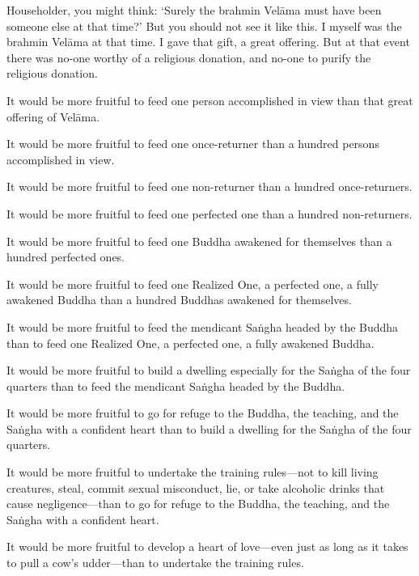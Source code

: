 \documentclass[12pt,openany]{book}%
\begin{document}
Householder, you might think: ‘Surely the brahmin \textsanskrit{Velāma} must have been someone else at that time?’ But you should not see it like this. I myself was the brahmin \textsanskrit{Velāma} at that time. I gave that gift, a great offering. But at that event there was no-one worthy of a religious donation, and no-one to purify the religious donation. 

It would be more fruitful to feed one person accomplished in view than that great offering of \textsanskrit{Velāma}. 

It would be more fruitful to feed one once-returner than a hundred persons accomplished in view. 

It would be more fruitful to feed one non-returner than a hundred once-returners. 

It would be more fruitful to feed one perfected one than a hundred non-returners. 

It would be more fruitful to feed one Buddha awakened for themselves than a hundred perfected ones. 

It would be more fruitful to feed one Realized One, a perfected one, a fully awakened Buddha than a hundred Buddhas awakened for themselves. 

It would be more fruitful to feed the mendicant \textsanskrit{Saṅgha} headed by the Buddha than to feed one Realized One, a perfected one, a fully awakened Buddha. 

It would be more fruitful to build a dwelling especially for the \textsanskrit{Saṅgha} of the four quarters than to feed the mendicant \textsanskrit{Saṅgha} headed by the Buddha. 

It would be more fruitful to go for refuge to the Buddha, the teaching, and the \textsanskrit{Saṅgha} with a confident heart than to build a dwelling for the \textsanskrit{Saṅgha} of the four quarters. 

It would be more fruitful to undertake the training rules—not to kill living creatures, steal, commit sexual misconduct, lie, or take alcoholic drinks that cause negligence—than to go for refuge to the Buddha, the teaching, and the \textsanskrit{Saṅgha} with a confident heart. 

It would be more fruitful to develop a heart of love—even just as long as it takes to pull a cow’s udder—than to undertake the training rules. 
\end{document}
